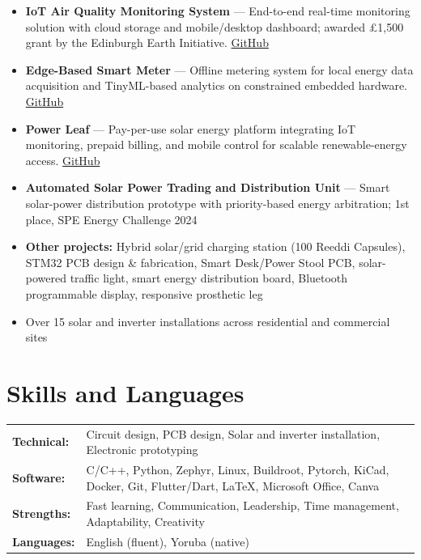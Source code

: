 \documentclass[10pt, a4paper]{article}
\begin{document}
\begin{itemize}
  \item \textbf{IoT Air Quality Monitoring System} --- End-to-end real-time monitoring solution with
        cloud storage and mobile/desktop dashboard; awarded \pounds1{,}500 grant by the Edinburgh
        Earth Initiative. \href{https://github.com/thew0205/iot_air_quality_board/tree/new_firmware_dev}{GitHub}

  \item \textbf{Edge-Based Smart Meter} --- Offline metering system for local energy data acquisition
        and TinyML-based analytics on constrained embedded hardware.
        \href{https://github.com/thew0205/smart_meter/tree/zephyr}{GitHub}

  \item \textbf{Power Leaf} --- Pay-per-use solar energy platform integrating IoT monitoring, prepaid
        billing, and mobile control for scalable renewable-energy access.
        \href{https://github.com/thew0205/power_leaf}{GitHub}

  \item \textbf{Automated Solar Power Trading and Distribution Unit} --- Smart solar-power distribution
        prototype with priority-based energy arbitration; 1st place, SPE Energy Challenge 2024

  \item \textbf{Other projects:} Hybrid solar/grid charging station (100 Reeddi Capsules), STM32 PCB
        design \& fabrication, Smart Desk/Power Stool PCB, solar-powered traffic light, smart energy
        distribution board, Bluetooth programmable display, responsive prosthetic leg

  \item Over 15 solar and inverter installations across residential and commercial sites
\end{itemize}

\section{Skills and Languages}

\noindent
\begin{tabularx}{\linewidth}{@{} l X @{}}
  \textbf{Technical:} & Circuit design, PCB design, Solar and inverter installation, Electronic prototyping                                   \\[2pt]
  \textbf{Software:}  & C/C++, Python, Zephyr, Linux, Buildroot, Pytorch, KiCad, Docker, Git, Flutter/Dart, \LaTeX{}, Microsoft Office, Canva \\[2pt]
  \textbf{Strengths:} & Fast learning, Communication, Leadership, Time management, Adaptability, Creativity                                   \\[2pt]
  \textbf{Languages:} & English (fluent), Yoruba (native)                                                                                     \\
\end{tabularx}
\end{document}
